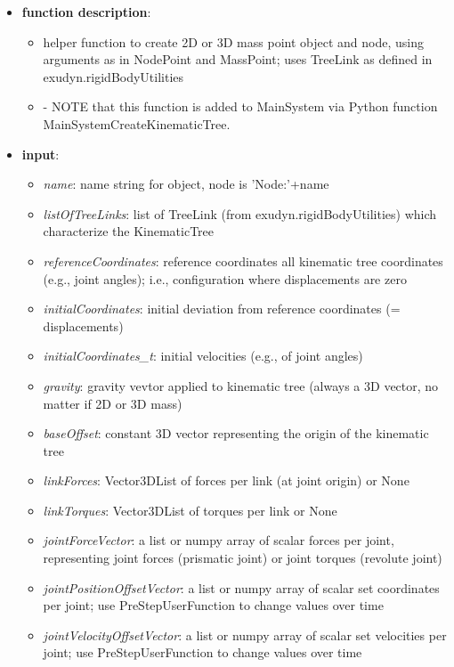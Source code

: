 \begin{itemize}[leftmargin=0.7cm]
\item[--]
{\bf function description}: \vspace{-6pt}
\begin{itemize}[leftmargin=1.2cm]
\setlength{\itemindent}{-0.7cm}
\item[]helper function to create 2D or 3D mass point object and node, using arguments as in NodePoint and MassPoint; uses TreeLink as defined in exudyn.rigidBodyUtilities
\item[]- NOTE that this function is added to MainSystem via Python function MainSystemCreateKinematicTree.
\end{itemize}
\item[--]
{\bf input}: \vspace{-6pt}
\begin{itemize}[leftmargin=1.2cm]
\setlength{\itemindent}{-0.7cm}
\item[]{\it name}: name string for object, node is 'Node:'+name
\item[]{\it listOfTreeLinks}: list of TreeLink (from exudyn.rigidBodyUtilities) which characterize the KinematicTree
\item[]{\it referenceCoordinates}: reference coordinates all kinematic tree coordinates (e.g., joint angles); i.e., configuration where displacements are zero
\item[]{\it initialCoordinates}: initial deviation from reference coordinates (= displacements)
\item[]{\it initialCoordinates\_t}: initial velocities (e.g., of joint angles)
\item[]{\it gravity}: gravity vevtor applied to kinematic tree (always a 3D vector, no matter if 2D or 3D mass)
\item[]{\it baseOffset}: constant 3D vector representing the origin of the kinematic tree
\item[]{\it linkForces}: Vector3DList of forces per link (at joint origin) or None
\item[]{\it linkTorques}: Vector3DList of torques per link or None
\item[]{\it jointForceVector}: a list or numpy array of scalar forces per joint, representing joint forces (prismatic joint) or joint torques (revolute joint)
\item[]{\it jointPositionOffsetVector}: a list or numpy array of scalar set coordinates per joint; use PreStepUserFunction to change values over time
\item[]{\it jointVelocityOffsetVector}: a list or numpy array of scalar set velocities per joint; use PreStepUserFunction to change values over time

\end{itemize}
\end{itemize}
